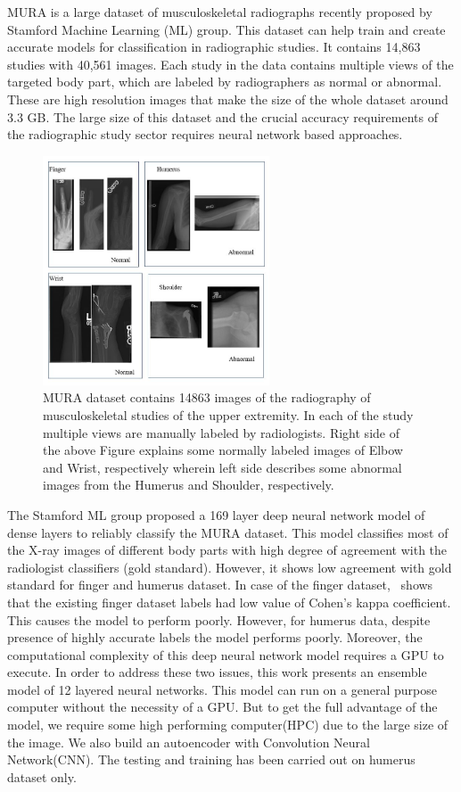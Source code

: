 \documentclass{article}
\begin{document}
MURA is a large dataset of musculoskeletal radiographs recently proposed by Stamford Machine Learning (ML) group. This dataset can help train and create accurate models for classification in radiographic studies. It contains 14,863 studies with 40,561 images. Each study in the data contains multiple views of the targeted body part, which are labeled by radiographers as normal or abnormal. These are high resolution images that make the size of the whole dataset around 3.3 GB. The large size of this dataset and the crucial accuracy requirements of the radiographic study sector requires neural network based approaches.
\begin{figure}[t]
\centering
\includegraphics[width=0.6\textwidth]{xray.JPG}
\caption{MURA dataset contains 14863 images of the radiography of musculoskeletal studies of the upper extremity. In each of the study multiple views are manually labeled by radiologists. Right side of the above Figure explains some normally labeled images of Elbow and Wrist, respectively wherein left side describes some abnormal images from the Humerus and Shoulder, respectively.}
\label{xray}
\end{figure} 

The Stamford ML group proposed a 169 layer deep neural network model of dense layers to reliably classify the MURA dataset. This model classifies most of the X-ray images of different body parts with high degree of agreement with the radiologist classifiers (gold standard). However, it shows low agreement with gold standard for finger and humerus dataset. In case of the finger dataset,~\cite{pranav_18} shows that the existing finger dataset labels had low value of Cohen's kappa coefficient. This causes the model to perform poorly. However, for humerus data, despite presence of highly accurate labels the model performs poorly. Moreover, the computational complexity of this deep neural network model requires a GPU to execute. In order to address these two issues, this work presents an ensemble model of 12 layered neural networks. This model can run on a general purpose computer without the necessity of a GPU. But to get the full advantage of the model, we require some high performing computer(HPC) due to the large size of the image. We also build an autoencoder with Convolution Neural Network(CNN). The testing and training has been carried out on humerus dataset only.
\end{document}
